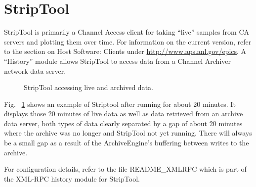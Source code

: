 \section{StripTool}
StripTool is primarily a Channel Access client for taking ``live''
samples from CA servers and plotting them over time.
For information on the current version, refer to the section on Host
Software: Clients under
\href{http://www.aps.anl.gov/epics}{http://www.aps.anl.gov/epics}.
A ``History'' module allows StripTool to access
data from a Channel Archiver network data server.

\medskip

\begin{figure}[htb]
\begin{center}
\end{center}
\caption{\label{fig:striptool}StripTool accessing live and archived data.}
\end{figure}

\noindent Fig.~ \ref{fig:striptool} shows an example of Striptool after running
for about 20 minutes. It displays those 20 minutes of live data as
well as data retrieved from an archive data server, both types of data
clearly separated by a gap of about 20 minutes where the archive was
no longer and StripTool not yet running.
There will always be a small gap as a result of the ArchiveEngine's
buffering between writes to the archive.

For configuration details, refer to the file README\_XMLRPC which is
part of the XML-RPC history module for StripTool.
